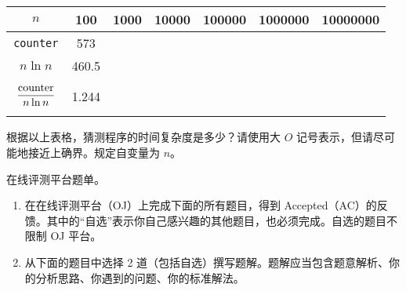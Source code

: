\begin{problemset}
\begin{enumerate}
		\begin{table}[H]
			\centering
			\begin{tabular}{|c|c|c|c|c|c|c|}
				\hline
				$n$ & 100 & 1000 & 10000 & 100000 & 1000000 & 10000000
				\\\hline
				\lstinline$counter$ & 573 & \phantom{8053} & \phantom{103643} & \phantom{1266714} & \phantom{14969985} & \phantom{172725300}
				\\\hline
				$n \ln n$ & 460.5 & \phantom{6907.8} & \phantom{92103.4} & \phantom{1151292.5} & \phantom{13815510.6} & \phantom{161180956.5}
				\\\hline
				$\phantom{\Biggl|} \dfrac{\text{\lstinline$counter$}}{n \ln n} \phantom{\Biggr|}$ & 1.244 & \phantom{1.166} & \phantom{1.125} & \phantom{1.100} & \phantom{1.084} & \phantom{1.072}
				\\\hline
			\end{tabular}
		\end{table}

		根据以上表格，猜测程序的时间复杂度是多少？请使用大 $O$ 记号表示，但请尽可能地接近上确界。规定自变量为 $n$。
	\end{enumerate}

	\item 在线评测平台题单。

	\begin{enumerate}
		\item 在在线评测平台（OJ）上完成下面的所有题目，得到 Accepted（AC）的反馈。其中的“自选”表示你自己感兴趣的其他题目，也必须完成。自选的题目不限制 OJ 平台。
		\item 从下面的题目中选择 2 道（包括自选）撰写题解。题解应当包含题意解析、你的分析思路、你遇到的问题、你的标准解法。
	\end{enumerate}


\end{problemset}
